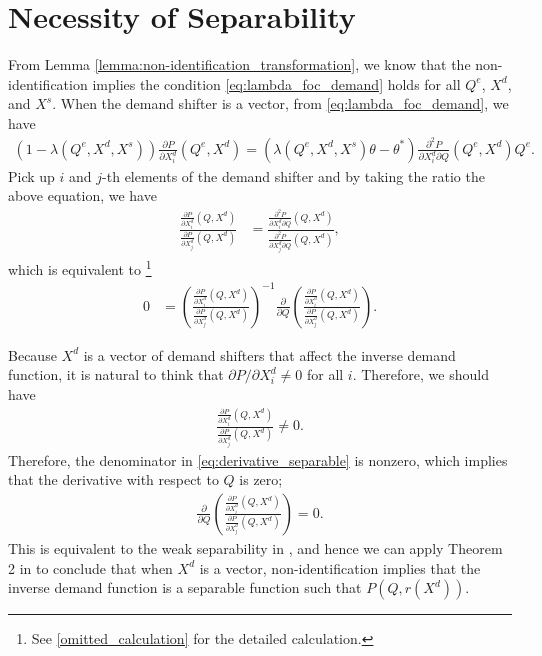 \documentclass[11pt, a4paper]{article}
\theoremstyle{remark}
\begin{document}
\section{Necessity of Separability}

From Lemma \ref{lemma:non-identification_transformation}, we know that the non-identification implies the condition \eqref{eq:lambda_foc_demand} holds for all $Q^e$, $X^{d}$, and $X^{s}$.
When the demand shifter is a vector, from \eqref{eq:lambda_foc_demand}, we have
\begin{align}
    (1 - \lambda(Q^e, X^{d}, X^{s}))\frac{\partial P}{\partial X^{d}_i}(Q^e, X^{d}) = (\lambda(Q^e, X^{d}, X^{s})\theta -  \theta^{*})\frac{\partial^2 P}{\partial X^{d}_i\partial Q}(Q^e, X^{d})Q^e.
\end{align}
Pick up $i$ and $j$-th elements of the demand shifter and by taking the ratio the above equation, we have
\begin{align}
    \frac{\frac{\partial P}{\partial X^{d}_{i}}(Q, X^{d})}{\frac{\partial P}{\partial X^{d}_{j}}(Q, X^{d})} & = \frac{ \frac{\partial^2 P}{\partial X^{d}_{i} \partial Q}(Q, X^{d})}{\frac{\partial^2 P}{\partial X^{d}_{j} \partial Q}(Q, X^{d})},
\end{align}
which is equivalent to \footnote{See \ref{omitted_calculation} for the detailed calculation.}
\begin{align}
    0 & = \left(\frac{\frac{\partial P}{\partial X^{d}_{i}}(Q, X^{d})}{\frac{\partial P}{\partial X^{d}_{j}}(Q, X^{d})}\right)^{-1} \frac{\partial}{\partial Q} \left(\frac{\frac{\partial P}{\partial X^{d}_{i}}(Q, X^{d})}{\frac{\partial P}{\partial X^{d}_{j}}(Q, X^{d})}\right).
    \label{eq:derivative_separable}
\end{align}

Because $X^{d}$ is a vector of demand shifters that affect the inverse demand function, it is natural to think that $\partial P/\partial X^{d}_{i} \ne 0$ for all $i$.
Therefore, we should have
\begin{align}
    \frac{\frac{\partial P}{\partial X^{d}_{i}}(Q, X^{d})}{\frac{\partial P}{\partial X^{d}_{j}}(Q, X^{d})} \ne 0.
\end{align}
Therefore, the denominator in \eqref{eq:derivative_separable} is nonzero, which implies that the derivative with respect to $Q$ is zero;
\begin{align}
    \frac{\partial}{\partial Q} \left(\frac{\frac{\partial P}{\partial X^{d}_{i}}(Q, X^{d})}{\frac{\partial P}{\partial X^{d}_{j}}(Q, X^{d})}\right) = 0.
\end{align}
This is equivalent to the weak separability in \citet{goldmanNote1964}, and hence we can apply Theorem 2 in \citet{goldmanNote1964} to conclude that when $X^{d}$ is a vector, non-identification implies that the inverse demand function is a separable function such that $P(Q, r(X^{d}))$.
\end{document}
